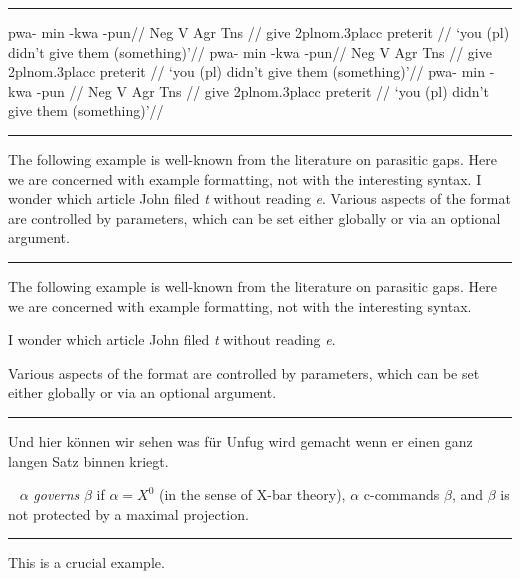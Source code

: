 \documentclass[12pt]{article}
\begin{document}
\filbreak\hrule\medskip

\begingroup
\pex[interpartskip=3ex]
\a
\begingl
\gla pwa- min -kwa -pun//
\glb Neg V Agr Tns //
\glc {} give 2pl{\sc nom}.3pl{\sc acc} preterit //
\glft `you (pl) didn't give them (something)'//
\endgl
\a
\begingl[everygl=\openup.5ex,everygla=,everyglb=,
   everyglft=\it,aboveglftskip=1.5ex]
\gla pwa- min -kwa -pun//
\glb Neg V Agr Tns //
\glc {} give 2pl{\sc nom}.3pl{\sc acc} preterit //
\glft `you (pl) didn't give them (something)'//
\endgl
\a
\begingl[everygl=,everygla=\bf,everyglb=\it,
   everyglft=,aboveglftskip=0pt]
\gla pwa- min -kwa -pun //
\glb Neg V Agr Tns //
\glc {} give 2pl{\sc nom}.3pl{\sc acc} preterit //
\glft `you (pl) didn't give them (something)'//
\endgl
\xe
\endgroup
\bigskip

\filbreak\hrule\medskip

\begingroup
\exdisplay
The following example is well-known from the literature on
parasitic gaps.  Here we are concerned with example formatting,
not with the interesting syntax.
\ex
I wonder which article John filed {\sl t\/} without reading {\sl e}.
\xe
Various aspects of the format are controlled by parameters, which
can be set either globally or via an optional argument.
\xe
\endgroup
\bigskip

\filbreak\hrule\medskip

\begingroup
\exdisplay
The following example is well-known from the literature on
parasitic gaps.  Here we are concerned with example formatting,
not with the interesting syntax.

\ex[numoffset=2em,textoffset=.5em,aboveexskip=1ex,belowexskip=1ex]
I wonder which article John filed {\sl t\/} without reading {\sl e}.
\xe

\noindent Various aspects of the format are controlled by
parameters, which can be set either globally or via an optional
argument.
\xe
\endgroup
\bigskip

\filbreak\hrule\medskip

\begingroup
\ex
Und hier k\"onnen wir sehen was f\"ur Unfug wird gemacht
wenn er einen ganz langen Satz binnen kriegt.\par\nobreak
\xe

\ex~
$\alpha$ {\it governs\/} $\beta$ if $\alpha=X^0$ (in the
sense of X-bar theory), $\alpha$ c-commands $\beta$, and $\beta$
is not protected by a maximal projection.
\xe
\endgroup
\bigskip

\filbreak\hrule\medskip

\begingroup
\ex[exno=95] This is a crucial example.\xe
\end{document}
